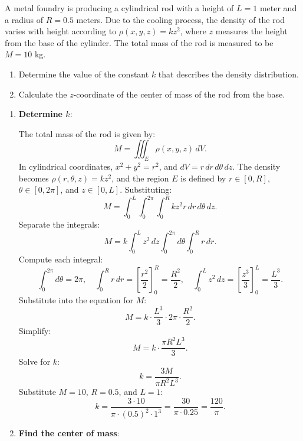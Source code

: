 \exampleline
\begin{example}
A metal foundry is producing a cylindrical rod with a height of $L = 1$ meter and a radius of $R = 0.5$ meters. Due to the cooling process, the density of the rod varies with height according to $\rho(x,y,z) = k z^2$, where $z$ measures the height from the base of the cylinder. The total mass of the rod is measured to be $M = 10$ kg.

\begin{enumerate}
    \item Determine the value of the constant $k$ that describes the density distribution.
    \item Calculate the $z$-coordinate of the center of mass of the rod from the base.
\end{enumerate}

\begin{solution}
\begin{enumerate}
    \item \textbf{Determine $k$}: 

    The total mass of the rod is given by:
    \[
    M = \iiint_E \rho(x,y,z)\,dV.
    \]
    In cylindrical coordinates, $x^2 + y^2 = r^2$, and $dV = r\,dr\,d\theta\,dz$. The density becomes $\rho(r,\theta,z) = k z^2$, and the region $E$ is defined by $r \in [0, R]$, $\theta \in [0, 2\pi]$, and $z \in [0, L]$. Substituting:
    \[
    M = \int_0^L \int_0^{2\pi} \int_0^R k z^2 r \,dr\,d\theta\,dz.
    \]
    Separate the integrals:
    \[
    M = k \int_0^L z^2\,dz \int_0^{2\pi} d\theta \int_0^R r\,dr.
    \]
    Compute each integral:
    \[
    \int_0^{2\pi} d\theta = 2\pi, \quad \int_0^R r\,dr = \left[\frac{r^2}{2}\right]_0^R = \frac{R^2}{2}, \quad \int_0^L z^2\,dz = \left[\frac{z^3}{3}\right]_0^L = \frac{L^3}{3}.
    \]
    Substitute into the equation for $M$:
    \[
    M = k \cdot \frac{L^3}{3} \cdot 2\pi \cdot \frac{R^2}{2}.
    \]
    Simplify:
    \[
    M = k \cdot \frac{\pi R^2 L^3}{3}.
    \]
    Solve for $k$:
    \[
    k = \frac{3M}{\pi R^2 L^3}.
    \]
    Substitute $M = 10$, $R = 0.5$, and $L = 1$:
    \[
    k = \frac{3 \cdot 10}{\pi \cdot (0.5)^2 \cdot 1^3} = \frac{30}{\pi \cdot 0.25} = \frac{120}{\pi}.
    \]

    \item \textbf{Find the center of mass}: 


\end{enumerate}
\end{solution}
\end{example}
